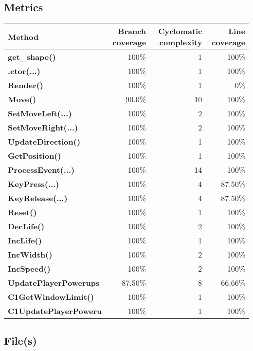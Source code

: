\documentclass[a4paper,landscape,10pt]{article}
\begin{document}
\subsection{Metrics}
\begin{longtable}[l]{|l|r|r|r|}
\hline
\textbf{Method} & \textbf{Branch coverage} & \textbf{Cyclomatic complexity} & \textbf{Line coverage}\\
\hline
\textbf{get\_shape()} & 100\% & 1 & 100\%\\
\hline
\textbf{.ctor(...)} & 100\% & 1 & 100\%\\
\hline
\textbf{Render()} & 100\% & 1 & 0\%\\
\hline
\textbf{Move()} & 90.0\% & 10 & 100\%\\
\hline
\textbf{SetMoveLeft(...)} & 100\% & 2 & 100\%\\
\hline
\textbf{SetMoveRight(...)} & 100\% & 2 & 100\%\\
\hline
\textbf{UpdateDirection()} & 100\% & 1 & 100\%\\
\hline
\textbf{GetPosition()} & 100\% & 1 & 100\%\\
\hline
\textbf{ProcessEvent(...)} & 100\% & 14 & 100\%\\
\hline
\textbf{KeyPress(...)} & 100\% & 4 & 87.50\%\\
\hline
\textbf{KeyRelease(...)} & 100\% & 4 & 87.50\%\\
\hline
\textbf{Reset()} & 100\% & 1 & 100\%\\
\hline
\textbf{DecLife()} & 100\% & 2 & 100\%\\
\hline
\textbf{IncLife()} & 100\% & 1 & 100\%\\
\hline
\textbf{IncWidth()} & 100\% & 2 & 100\%\\
\hline
\textbf{IncSpeed()} & 100\% & 2 & 100\%\\
\hline
\textbf{UpdatePlayerPowerups} & 87.50\% & 8 & 66.66\%\\
\hline
\textbf{C1GetWindowLimit()} & 100\% & 1 & 100\%\\
\hline
\textbf{C1UpdatePlayerPoweru} & 100\% & 1 & 100\%\\
\hline
\end{longtable}
\subsection{File(s)}
\end{document}
